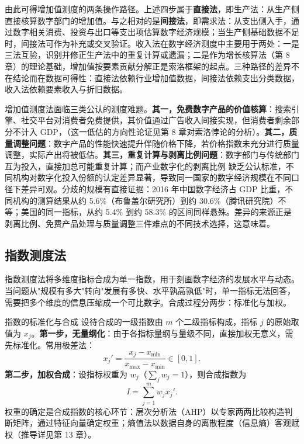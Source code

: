 由此可得增加值测度的两条操作路径。上述四步属于\textbf{直接法}，即生产法：从生产侧直接核算数字部门的增加值。与之相对的是\textbf{间接法}，即需求法：从支出侧入手，通过数字相关消费、投资与出口等支出项估算数字经济规模；当生产侧基础数据不足时，间接法可作为补充或交叉验证。收入法在数字经济测度中主要用于两处：一是三法互验，识别并修正生产法中的重复计算或遗漏；二是作为增长核算法（第 8 章）的理论基础，增加值按要素贡献分解正是索洛框架的起点。三种路径的差异不在结论而在数据可得性：直接法依赖行业增加值数据，间接法依赖支出分类数据，收入法依赖要素收入与折旧数据。

增加值测度法面临三类公认的测度难题。\textbf{其一，免费数字产品的价值核算}：搜索引擎、社交平台对消费者免费提供，其价值通过广告收入间接实现，但消费者剩余部分不计入 GDP，（这一低估的方向性论证见第 8 章对索洛悖论的分析）。\textbf{其二，质量调整问题}：数字产品的性能快速提升伴随价格下降，若价格指数未充分进行质量调整，实际产出将被低估。\textbf{其三，重复计算与剥离比例问题}：数字部门与传统部门互为投入，直接加总可能重复计算；而产业数字化的剥离比例  缺乏公认标准，不同机构对数字化投入份额的认定差异显著，导致同一国家的数字经济规模在不同口径下差异可观。分歧的规模有直接证据：2016 年中国数字经济占 GDP 比重，不同机构的测算结果从约 5.6\%（布鲁盖尔研究所）到约 30.6\%（腾讯研究院）不等；美国的同一指标，从约 5.4\% 到约 58.3\% 的区间同样悬殊。差异的来源正是剥离比例、免费产品处理与质量调整三件难点的不同技术选择，这意味着。

\subsection{指数测度法}

指数测度法将多维度指标合成为单一指数，用于刻画数字经济的发展水平与动态。当问题从"规模有多大"转向"发展有多快、水平孰高孰低"时，单一指标无法回答，需要把多个维度的信息压缩成一个可比数字。合成过程分两步：标准化与加权。

\begin{derivation}{指数的标准化与合成}{}
设待合成的一级指数由 $m$ 个二级指标构成，指标 $j$ 的原始取值为 $x_j$。\textbf{第一步，无量纲化}：由于各指标量纲与量级不同，直接加权无意义，需先标准化。常用极差法：
\[
x_j' = \frac{x_j - x_{\min}}{x_{\max} - x_{\min}} \in [0,1].
\]
\textbf{第二步，加权合成}：设指标权重为 $w_j$（$\sum_j w_j = 1$），则合成指数为
\[
I = \sum_{j=1}^{m} w_j x_j'.
\]
权重的确定是合成指数的核心环节：层次分析法（AHP）以专家两两比较构造判断矩阵，通过特征向量确定权重；熵值法以数据自身的离散程度（信息熵）客观赋权（推导详见第 13 章）。
\end{derivation}

